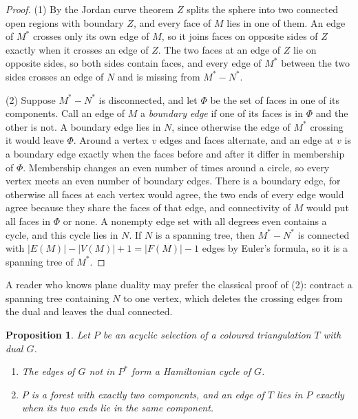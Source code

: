 \documentclass[10pt]{amsart}
\numberwithin{equation}{section}
\newtheorem{proposition}[equation]{Proposition}
\theoremstyle{definition}
\theoremstyle{remark}
\newcommand{\T}{T}
\begin{document}
\begin{proof}
(1) By the Jordan curve theorem $Z$ splits the sphere into two connected open regions with boundary $Z$, and every face of $M$ lies in one of them.
An edge of $M^*$ crosses only its own edge of $M$, so it joins faces on opposite sides of $Z$ exactly when it crosses an edge of $Z$.
The two faces at an edge of $Z$ lie on opposite sides, so both sides contain faces, and every edge of $M^*$ between the two sides crosses an edge of $N$ and is missing from $M^*-N^*$.

(2) Suppose $M^*-N^*$ is disconnected, and let $\Phi$ be the set of faces in one of its components.
Call an edge of $M$ a \emph{boundary edge} if one of its faces is in $\Phi$ and the other is not.
A boundary edge lies in $N$, since otherwise the edge of $M^*$ crossing it would leave $\Phi$.
Around a vertex $v$ edges and faces alternate, and an edge at $v$ is a boundary edge exactly when the faces before and after it differ in membership of $\Phi$.
Membership changes an even number of times around a circle, so every vertex meets an even number of boundary edges.
There is a boundary edge, for otherwise all faces at each vertex would agree, the two ends of every edge would agree because they share the faces of that edge, and connectivity of $M$ would put all faces in $\Phi$ or none.
A nonempty edge set with all degrees even contains a cycle, and this cycle lies in $N$.
If $N$ is a spanning tree, then $M^*-N^*$ is connected with $|E(M)|-|V(M)|+1=|F(M)|-1$ edges by Euler's formula, so it is a spanning tree of $M^*$.
\end{proof}

A reader who knows plane duality may prefer the classical proof of (2): contract a spanning tree containing $N$ to one vertex, which deletes the crossing edges from the dual and leaves the dual connected.

\begin{proposition}\label{prop:target}
Let $P$ be an acyclic selection of a coloured triangulation $\T$ with dual $G$.
\begin{enumerate}
\item The edges of $G$ not in $P^*$ form a Hamiltonian cycle of $G$.
\item $P$ is a forest with exactly two components, and an edge of $\T$ lies in $P$ exactly when its two ends lie in the same component.
\end{enumerate}
\end{proposition}
\end{document}
